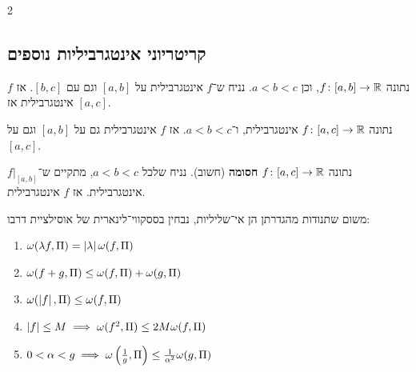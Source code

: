 \documentclass[]{../../../tex/classes/styledArticle}
\begin{document}
\begin{multicols}{2}
		\subsection{קריטריוני אינטגרביליות נוספים}
			\begin{Theorem}
				נתונה $f \colon [a, b] \to \mathbb{R}$, וכן $a < b < c$. נניח ש־$f$ אינטגרבילית על $[a, b]$ וגם עם $[b, c]$. אז $f$ אינטגרבילית אז $[a, c]$.
			\end{Theorem}
			\begin{Theorem}[תת־קטע]
				נתונה $f \colon [a, c] \to \mathbb{R}$ אינטגרבילית, ו־$a < b < c$. אז $f$ אינטגרבילית גם על $[a, b]$ וגם על $[a, c]$.
			\end{Theorem}
			\begin{Theorem}
				נתונה $f \colon [a, c] \to \mathbb{R}$ \textbf{חסומה} (חשוב). נניח שלכל $a < b < c$, מתקיים ש־$f|_{[a, b]}$ אינטגרבילית. אז $f$ אינטגרבילית.
			\end{Theorem}
			
			\begin{Collary}
				משום שתנודות מהגדרתן הן אי־שליליות, נבחין בססקווי־לינארית של אוסילציית דרבו:
				\begin{enumerate}
					\item \hfil $\omega(\lambda f, \Pi) = \left \lvert \lambda \right \rvert \omega(f, \Pi)$
					\item \hfil $\omega(f + g, \Pi) \le \omega(f, \Pi) + \omega(g, \Pi)$
					\item \hfil $\omega(\left \lvert f \right \rvert, \Pi) \le \omega(f, \Pi)$
					\item \hfil $\left \lvert f \right \rvert \le M \implies \omega(f^{2}, \Pi) \le 2M\omega(f, \Pi)$
					\item \hfil $0 < \alpha < g \implies \omega\left ( \frac{1}{g}, \Pi \right ) \le \frac{1}{\alpha^{2}}\omega(g, \Pi)$
				\end{enumerate}
			\end{Collary}
			

\end{multicols}
\end{document}
